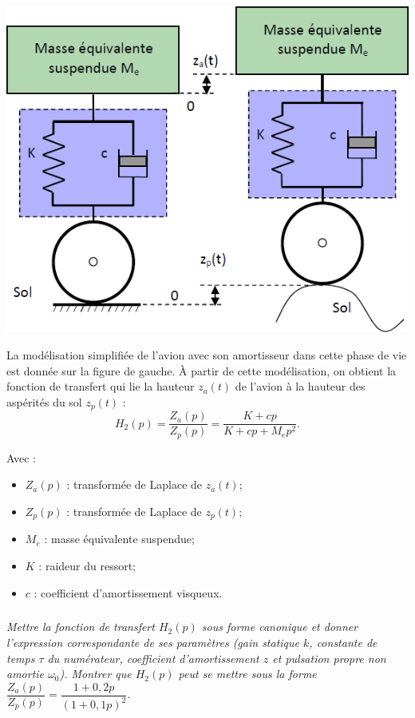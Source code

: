 \documentclass[10pt,fleqn]{article} %
\begin{document}
\begin{multicols}{2}
\begin{center}
\includegraphics[width=\linewidth]{images/img_05}
\end{center}

La modélisation simplifiée de l'avion avec son
amortisseur dans cette phase de vie est
donnée sur la figure de gauche. À partir de
cette modélisation, on obtient la fonction de
transfert qui lie la hauteur $z_a(t)$ de l'avion à la
hauteur des aspérités du sol $z_p(t)$ :
$$
H_2(p)=\dfrac{Z_a(p)}{Z_p(p)}=\dfrac{K+cp}{K+cp+M_e p^2}.
$$

Avec :
\begin{itemize}
\item $Z_a(p)$ : transformée de Laplace de $z_a(t)$;
\item $Z_p(p)$ : transformée de Laplace de $z_p(t)$;
\item $M_e$ : masse équivalente suspendue;
\item $K$ : raideur du ressort;
\item $c$ : coefficient d’amortissement visqueux.
\end{itemize}



\subparagraph{}
\textit{Mettre la fonction de transfert $H_2(p)$ sous forme canonique et donner l’expression correspondante de ses paramètres (gain statique $k$, constante de temps $\tau$ du numérateur, coefficient d’amortissement $z$ et pulsation
propre non amortie $\omega_0$). Montrer que $H_2(p)$ peut se mettre sous la forme $\dfrac{Z_a(p)}{Z_p(p)}=\dfrac{1+0,2p}{\left(1+0,1p\right)^2}$.}
\ifprof
\begin{corrige}
\end{corrige}
\else
\fi


\end{multicols}
\end{document}
